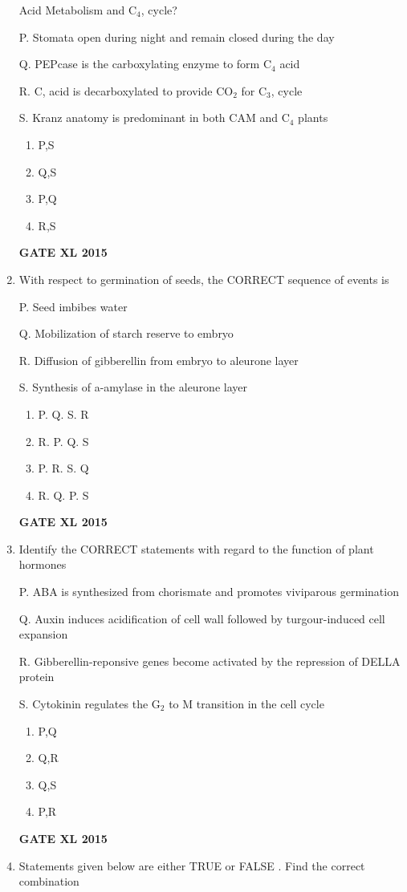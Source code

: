 \documentclass[journal,12pt,onecolumn]{IEEEtran}
\begin{document}
\begin{enumerate}
Acid Metabolism  and C$_4$, cycle?

P. Stomata open during night and remain closed during the day

Q. PEPcase is the carboxylating enzyme to form C$_4$ acid

R. C, acid is decarboxylated to provide CO$_2$ for C$_3$, cycle

S. Kranz anatomy is predominant in both CAM and C$_4$ plants
    \begin{enumerate}
            \item P,S
	    \item Q,S
	    \item P,Q
            \item R,S
    \end{enumerate}
\begin{flushright}\textbf{GATE XL 2015}\end{flushright}
\item With respect to germination of seeds, the CORRECT sequence of events is

P. Seed imbibes water

Q. Mobilization of starch reserve to embryo

R. Diffusion of gibberellin from embryo to aleurone layer

S. Synthesis of a-amylase in the aleurone layer
    \begin{enumerate}
            \item P. Q. S. R
	    \item R. P. Q. S
	    \item P. R. S. Q
            \item R. Q. P. S
    \end{enumerate}
\begin{flushright}\textbf{GATE XL 2015}\end{flushright}
\item 
Identify the CORRECT statements with regard to the function of plant hormones

P. ABA is synthesized from chorismate and promotes viviparous germination

Q. Auxin induces acidification of cell wall followed by turgour-induced cell expansion

R. Gibberellin-reponsive genes become activated by the repression of DELLA protein

S. Cytokinin regulates the G$_2$ to M transition in the cell cycle
    \begin{enumerate}
            \item P,Q
	    \item Q,R
	    \item Q,S
            \item P,R
    \end{enumerate}
\begin{flushright}\textbf{GATE XL 2015}\end{flushright}
\item Statements given below are either TRUE  or FALSE . Find the correct combination


\end{enumerate}
\end{document}
